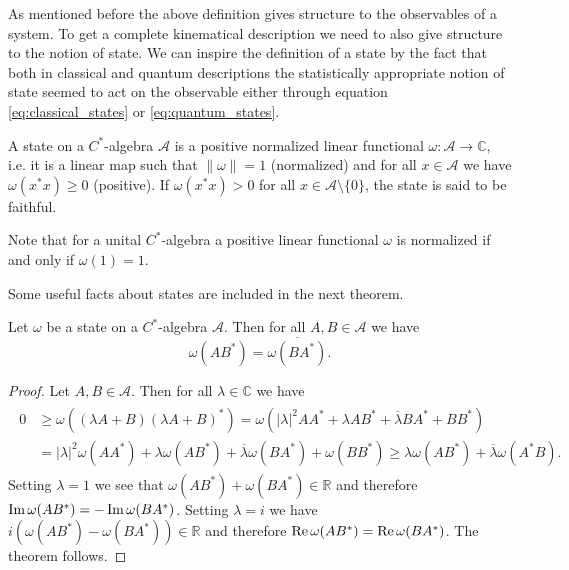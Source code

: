 As mentioned before the above definition gives structure to the observables of a system. To get a complete kinematical description we need to also give structure to the notion of state. We can inspire the definition of a state by the fact that both in classical and quantum descriptions the statistically appropriate notion of state seemed to act on the observable either through equation \ref{eq:classical_states} or \ref{eq:quantum_states}.

\begin{definition}
A state on a $C^*$-algebra $\mathcal{A}$ is a positive normalized linear functional $\omega:\mathcal{A}\rightarrow \mathbb{C}$, i.e. it is a linear map such that $\|\omega\| = 1$ (normalized) and for all $x\in\mathcal{A}$ we have $\omega(x^*x)\geq 0$ (positive). If $\omega(x^*x)>0$ for all $x\in\mathcal{A}\setminus\{0\}$, the state is said to be faithful.
\end{definition}  

Note that for a unital $C^*$-algebra a positive linear functional $\omega$ is normalized if and only if $\omega(1)=1$\cite{Bratteli1997}.

Some useful facts about states are included in the next theorem\cite{Bratteli1997}.

\begin{theorem}
Let $\omega$ be a state on a $C^*$-algebra $\mathcal{A}$. Then for all $A,B\in\mathcal{A}$ we have
\begin{equation}
\omega(AB^*)=\overline{\omega(BA^*)}.
\end{equation}
\end{theorem}

\begin{proof}
Let $A,B\in\mathcal{A}$. Then for all $\lambda\in\mathbb{C}$ we have
\begin{align}
\begin{split}
0 &\geq \omega((\lambda A + B)(\lambda A + B)^*)=\omega(|\lambda|^2AA^*+\lambda AB^* + \overline{\lambda}BA^*+BB^*) \\
&=|\lambda|^2\omega(AA^*)+\lambda \omega(AB^*) + \overline{\lambda}\omega(BA^*)+\omega(BB^*)\geq \lambda\omega(AB^*)+\overline{\lambda}\omega(A^*B).
\end{split}
\end{align}
Setting $\lambda=1$ we see that $\omega(AB^*)+\omega(BA^*)\in\mathbb{R}$ and therefore $\operatorname{Im}\omega(AB^*)=-\operatorname{Im}\omega(BA^*)$. Setting $\lambda = i$ we have $i(\omega(AB^*)-\omega(BA^*))\in\mathbb{R}$ and therefore $\operatorname{Re}\omega(AB^*)=\operatorname{Re}\omega(BA^*)$. The theorem follows. 
\end{proof}

